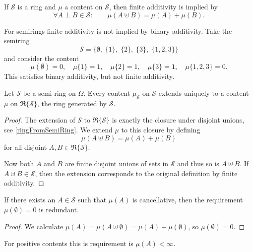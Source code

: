 \begin{lemma}
If $\mathcal{S}$ is a ring and $\mu$ a content on $\mathcal{S}$, then finite additivity is implied by
\[ \forall A\perp B\in \mathcal{S}:\qquad \mu(A\uplus B) = \mu(A) + \mu(B). \]
\end{lemma}

\begin{example}
For semirings finite additivity is not implied by binary additivity. Take the semiring
\[ \mathcal{S} = \big\{\emptyset,\; \{1\},\; \{2\},\; \{3\},\; \{1,2,3\}\big\} \]
and consider the content
\[ \mu(\emptyset) = 0,\quad \mu\{1\} = 1, \quad \mu\{2\} = 1, \quad \mu\{3\} = 1, \quad \mu\{1,2,3\} = 0. \]
This satisfies binary additivity, but not finite additivity.
\end{example}

\begin{lemma} \label{contentsOnSemiRingToRing}
Let $\mathcal{S}$ be a semi-ring on $\Omega$. Every content $\mu_\mathcal{S}$ on $\mathcal{S}$ extends uniquely to a content $\mu$ on $\mathfrak{R}\{\mathcal{S}\}$, the ring generated by $\mathcal{S}$.
\end{lemma}
\begin{proof}
The extension of $\mathcal{S}$ to $\mathfrak{R}\{\mathcal{S}\}$ is exactly the closure under disjoint unions, see \ref{ringFromSemiRing}. We extend $\mu$ to this closure by defining
\[ \mu(A\uplus B) = \mu(A) + \mu(B) \]
for all disjoint $A,B\in \mathfrak{R}\{\mathcal{S}\}$. 

Now both $A$ and $B$ are finite disjoint unions of sets in $\mathcal{S}$ and thus so is $A\uplus B$. If $A\uplus B \in \mathcal{S}$, then the extension corresponds to the original definition by finite additivity.
\end{proof}

\begin{lemma} \label{emptysetNullset}
If there exists an $A\in \mathcal{S}$ such that $\mu(A)$ is cancellative, then the requirement $\mu(\emptyset) = 0$ is redundant.
\end{lemma}
\begin{proof}
We calculate $\mu(A) = \mu(A \uplus \emptyset) = \mu(A) + \mu(\emptyset)$, so $\mu(\emptyset) = 0$.
\end{proof}
For positive contents this is requirement is $\mu(A) < \infty$.

